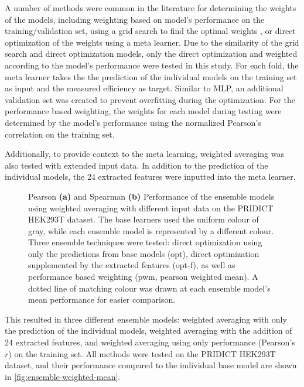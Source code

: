 A number of methods were common in the literature for determining the weights of the models, including weighting based on model's performance on the training/validation set\cite{fathiImprovingPrecipitationForecasts2019}, using a grid search to find the optimal weights \cite{anandWeightedAverageEnsemble2023}, or direct optimization of the weights using a meta learner. Due to the similarity of the grid search and direct optimization models, only the direct optimization and weighted according to the model's performance were tested in this study. For each fold, the meta learner takes the the prediction of the individual models on the training set as input and the measured efficiency as target. Similar to MLP, an additional validation set was created to prevent overfitting during the optimization. For the performance based weighting, the weights for each model during testing were determined by the model's performance using the normalized Pearson's correlation on the training set. 

Additionally, to provide context to the meta learning, weighted averaging was also tested with extended input data. In addition to the prediction of the individual models, the 24 extracted features were inputted into the meta learner. 

\begin{figure}
    \caption[Ensemble Model Performance]{Pearson \textbf{(a)} and Spearman \textbf{(b)} Performance of the ensemble models using weighted averaging with different input data on the PRIDICT HEK293T dataset. The base learners used the uniform colour of gray, while each ensemble model is represented by a different colour. Three ensemble techniques were tested: direct optimization using only the predictions from base models (opt), direct optimization supplemented by the extracted features (opt-f), as well as performance based weighting (pwm, pearson weighted mean). A dotted line of matching colour was drawn at each ensemble model's mean performance for easier comparison.}
    \label{fig:ensemble-weighted-mean}
\end{figure}

This resulted in three different ensemble models: weighted averaging with only the prediction of the individual models, weighted averaging with the addition of 24 extracted features, and weighted averaging using only performance (Pearson's $r$) on the training set. All methods were tested on the PRIDICT HEK293T dataset, and their performance compared to the individual base model are shown in \autoref{fig:ensemble-weighted-mean}.


